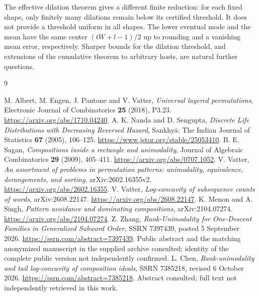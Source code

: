 \documentclass[11pt]{article}
\theoremstyle{remark}\newtheorem{remark}[theorem]{Remark}
\begin{document}
The effective dilation theorem gives a different finite reduction:
for each fixed shape, only finitely many dilations remain below its
certified threshold. It does not provide a threshold uniform in all
shapes. The lower eventual mode and the mean have the same center
$(tW+l-1)/2$ up to rounding and a vanishing mean error, respectively.
Sharper bounds for the dilation threshold, and extensions of the
cumulative theorem to arbitrary hosts, are natural further questions.



\clearpage
\begin{thebibliography}{9}
\raggedright
{} M. Albert, M. Engen, J. Pantone and V. Vatter, \emph{Universal layered permutations}, Electronic Journal of Combinatorics \textbf{25} (2018), P3.23. \url{https://arxiv.org/abs/1710.04240}.
 A. K. Nanda and D. Sengupta, \emph{Discrete Life Distributions with Decreasing Reversed Hazard}, Sankhy\={a}: The Indian Journal of Statistics \textbf{67} (2005), 106--125. \url{https://www.jstor.org/stable/25053410}.
 B. E. Sagan, \emph{Compositions inside a rectangle and unimodality}, Journal of Algebraic Combinatorics \textbf{29} (2009), 405--411. \url{https://arxiv.org/abs/0707.1052}.
 V. Vatter, \emph{An assortment of problems in permutation patterns: unimodality, equivalence, derangements, and sorting}, arXiv:2602.16355v2. \url{https://arxiv.org/abs/2602.16355}.
 V. Vatter, \emph{Log-concavity of subsequence counts of words}, arXiv:2608.22147. \url{https://arxiv.org/abs/2608.22147}.
 K. Menon and A. Singh, \emph{Pattern avoidance and dominating compositions}, arXiv:2104.07274. \url{https://arxiv.org/abs/2104.07274}.
 Z. Zhang, \emph{Rank-Unimodality for One-Descent Families in Generalized Subword Order}, SSRN 7397439, posted 5 September 2026. \url{https://ssrn.com/abstract=7397439}. Public abstract and the matching anonymized manuscript in the supplied archive consulted; identity of the complete public version not independently confirmed.
 L. Chen, \emph{Rank-unimodality and tail log-concavity of composition ideals}, SSRN 7385218, revised 6 October 2026. \url{https://ssrn.com/abstract=7385218}. Abstract consulted; full text not independently retrieved in this work.
\end{thebibliography}
\end{document}
